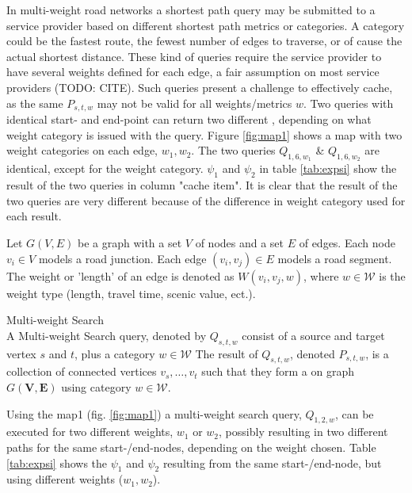 In multi-weight road networks\cite{icdeMouratidisLY10} a shortest path query may be submitted to a service provider based on different shortest path metrics or categories. A category could be the fastest route, the fewest number of edges to traverse, or of cause the actual shortest distance. These kind of queries require the \spath service provider to have several weights defined for each edge, a fair assumption on most service providers (TODO: CITE).
Such queries present a challenge to effectively cache, as the same \spath $P_{s,t,w}$ may not be valid for all weights/metrics $w$.
Two queries with identical start- and end-point can return two different \spathsns, depending on what weight category is issued with the query. Figure \ref{fig:map1} shows a map with two weight categories on each edge, $w_1,w_2$. The two queries $Q_{1,6,w_1}$ \& $Q_{1,6,w_2}$ are identical, except for the weight category. $\psi_1$ and $\psi_2$ in table \ref{tab:expsi} show the \spath result of the two queries in column "cache item". It is clear that the result of the two queries are very different because of the difference in weight category used for each result.




\begin{definition}
Let $G(V, E)$ be a graph with a set $V$ of nodes and a set $E$ of edges.
Each node $v_i \in V$ models a road junction. Each edge $(v_i, v_j) \in
E$ models a road segment. The weight or 'length' of an edge is denoted as $W(v_i, v_j, w)$, where $w \in \mathcal{W}$ is the weight type (length, travel time, scenic value, ect.).
\end{definition}



\begin{definition}{Multi-weight Search}\\
A Multi-weight Search query, denoted by $Q_{s,t,w}$ consist of a source and target vertex $s$ and $t$, plus a category $w \in \mathcal{W}$ 
The result of $Q_{s,t,w}$, denoted $P_{s,t,w}$, is a collection of connected vertices $v_s,\dotsc,v_t$ such that they form a \spath on graph $G\mathbf{(V,E)}$ using category $w \in \mathcal{W}$.
\end{definition}


Using the map1 (fig. \ref{fig:map1}) a multi-weight search query, $Q_{1,2,w}$, can be executed for two different weights, $w_1$ or $w_2$, possibly resulting in two different paths for the same start-/end-nodes, depending on the weight chosen. Table \ref{tab:expsi} shows the \spath $\psi_1$ and $\psi_2$ resulting from the same start-/end-node, but using different weights ($w_1, w_2$).


